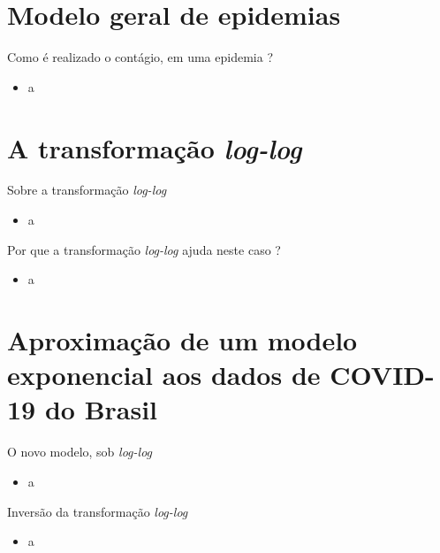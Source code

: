 \documentclass[a4paper,10pt]{beamer}
\begin{document}
\section{Modelo geral de epidemias}

\begin{frame}{Como é realizado o contágio, em uma epidemia ?}
    \begin{itemize}
	\item a
    \end{itemize}

\end{frame}

\section{A transformação {\em log-log}}

\begin{frame}{Sobre a transformação {\em log-log}}
    \begin{itemize}
	\item a
    \end{itemize}

\end{frame}

\begin{frame}{Por que a transformação {\em log-log} ajuda neste caso ?}
    \begin{itemize}
	\item a
    \end{itemize}

\end{frame}

\section{Aproximação de um modelo exponencial aos dados de COVID-19 do Brasil}

\begin{frame}{O novo modelo, sob {\em log-log}}
    \begin{itemize}
	\item a
    \end{itemize}

\end{frame}

\begin{frame}{Inversão da transformação {\em log-log}}
    \begin{itemize}
	\item a
    \end{itemize}

\end{frame}
\end{document}
